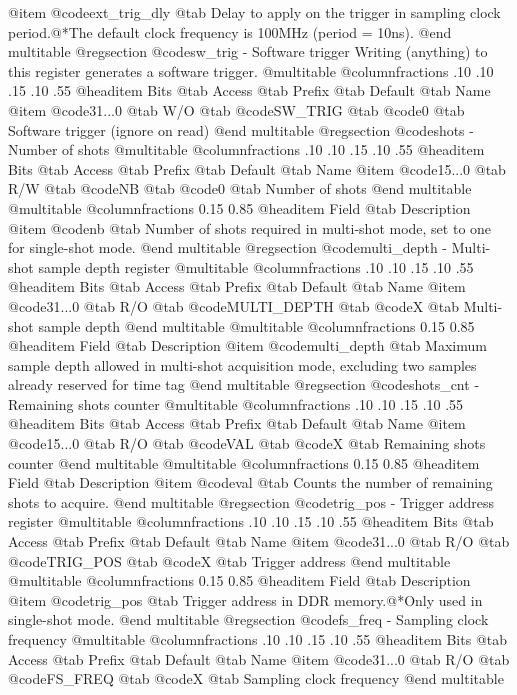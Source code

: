 @item @code{ext_trig_dly} @tab Delay to apply on the trigger in sampling clock period.@*The default clock frequency is 100MHz (period = 10ns).
@end multitable
@regsection @code{sw_trig} - Software trigger
Writing (anything) to this register generates a software trigger.
@multitable @columnfractions .10 .10 .15 .10 .55
@headitem Bits @tab Access @tab Prefix @tab Default @tab Name
@item @code{31...0}
@tab W/O @tab
@code{SW_TRIG}
@tab @code{0} @tab 
Software trigger (ignore on read)
@end multitable
@regsection @code{shots} - Number of shots
@multitable @columnfractions .10 .10 .15 .10 .55
@headitem Bits @tab Access @tab Prefix @tab Default @tab Name
@item @code{15...0}
@tab R/W @tab
@code{NB}
@tab @code{0} @tab 
Number of shots
@end multitable
@multitable @columnfractions 0.15 0.85
@headitem Field @tab Description
@item @code{nb} @tab Number of shots required in multi-shot mode, set to one for single-shot mode.
@end multitable
@regsection @code{multi_depth} - Multi-shot sample depth register
@multitable @columnfractions .10 .10 .15 .10 .55
@headitem Bits @tab Access @tab Prefix @tab Default @tab Name
@item @code{31...0}
@tab R/O @tab
@code{MULTI_DEPTH}
@tab @code{X} @tab 
Multi-shot sample depth
@end multitable
@multitable @columnfractions 0.15 0.85
@headitem Field @tab Description
@item @code{multi_depth} @tab Maximum sample depth allowed in multi-shot acquisition mode, excluding two samples already reserved for time tag
@end multitable
@regsection @code{shots_cnt} - Remaining shots counter
@multitable @columnfractions .10 .10 .15 .10 .55
@headitem Bits @tab Access @tab Prefix @tab Default @tab Name
@item @code{15...0}
@tab R/O @tab
@code{VAL}
@tab @code{X} @tab 
Remaining shots counter
@end multitable
@multitable @columnfractions 0.15 0.85
@headitem Field @tab Description
@item @code{val} @tab Counts the number of remaining shots to acquire.
@end multitable
@regsection @code{trig_pos} - Trigger address register
@multitable @columnfractions .10 .10 .15 .10 .55
@headitem Bits @tab Access @tab Prefix @tab Default @tab Name
@item @code{31...0}
@tab R/O @tab
@code{TRIG_POS}
@tab @code{X} @tab 
Trigger address
@end multitable
@multitable @columnfractions 0.15 0.85
@headitem Field @tab Description
@item @code{trig_pos} @tab Trigger address in DDR memory.@*Only used in single-shot mode.
@end multitable
@regsection @code{fs_freq} - Sampling clock frequency
@multitable @columnfractions .10 .10 .15 .10 .55
@headitem Bits @tab Access @tab Prefix @tab Default @tab Name
@item @code{31...0}
@tab R/O @tab
@code{FS_FREQ}
@tab @code{X} @tab 
Sampling clock frequency
@end multitable
